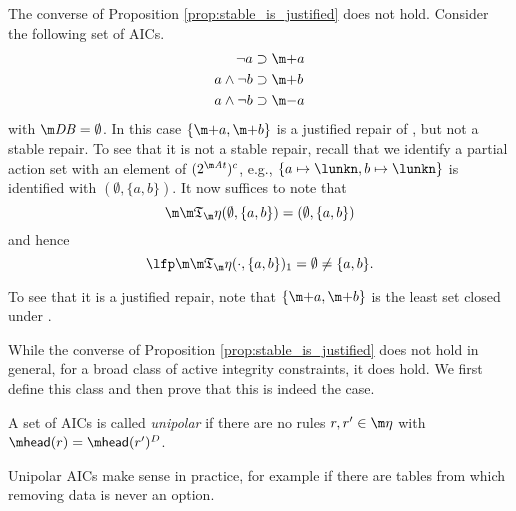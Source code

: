 \begin{example}\label{ex:justified_not_stable}
 The converse of Proposition \ref{prop:stable_is_justified} does not hold. Consider the following set \aics of AICs. 
 \begin{align*}
  \lnot a &\aicrule \add a \\
  a\land \lnot b &\aicrule \add b\\
  a \land \lnot b &\aicrule \remove a
 \end{align*}
 with $\db=\emptyset$. 
 In this case $\{\add a,\add b\}$ is a justified repair of \fulldb, but not a stable repair. 
 To see that it is not a stable repair, recall that we identify a partial action set with an element of $(2^{\atoms})^c$, e.g., $\{a\mapsto\lunkn,b\mapsto\lunkn\}$ is identified with $(\emptyset,\{a,b\})$. It now suffices to note that 
 \[
 \Ap(\emptyset,\{a,b\}) = (\emptyset,\{a,b\})
 \]
 and hence
 \[
 \lfp \Ap(\cdot,\{a,b\})_1 = \emptyset\neq \{a,b\}.\]
  
To see that it is a justified repair, note that $\{\add a,\add b\}$ is the least set closed under \aics. 
\end{example}

While the converse of Proposition \ref{prop:stable_is_justified} does not hold in general, for a broad class of active integrity constraints, it does hold. We first define this class and then prove that this is indeed the case. 

\begin{definition}
 A set of AICs \aics is called \emph{unipolar} if there are no rules $r,r'\in\aics$ with $\head(r)=\head(r')^D$. 
\end{definition}

Unipolar AICs make sense in practice, for example if there are tables from which removing data is never an option.



